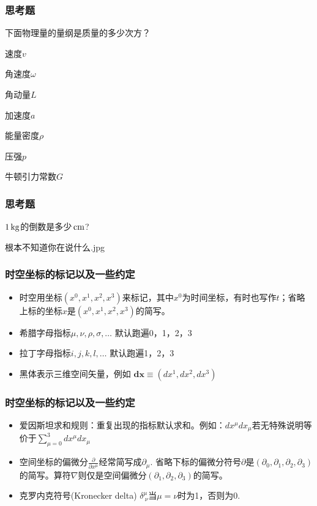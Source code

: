 \documentclass[CJK]{beamer}
\begin{document}
\begin{frame}
\frametitle{\bch 思考题\ech}
\bch
{}

下面物理量的量纲是质量的多少次方？

速度$v$

角速度$\omega$

角动量$L$

加速度$a$

能量密度$\rho$

压强$p$

牛顿引力常数$G$

\ech
\end{frame}


\begin{frame}
\frametitle{\bch 思考题 \ech}
\bch
$1\,\mathrm{kg}$的倒数是多少$\,\mathrm{cm}$?

\bcenter
{}

根本不知道你在说什么.jpg
\ecenter
\ech
\end{frame}



\begin{frame}
\frametitle{\bch 时空坐标的标记以及一些约定 \ech}
\bch
\begin{itemize}
\item{时空用坐标$(x^0, x^1, x^2, x^3)$来标记，其中$x^0$为时间坐标，有时也写作$t$；省略上标的坐标$x$是$(x^0, x^1, x^2, x^3)$的简写。}
\item{希腊字母指标$\mu, \nu, \rho, \sigma,\ldots$ 默认跑遍0，1，2，3}
\item{拉丁字母指标$i, j,  k, l,\ldots$ 默认跑遍1，2，3}
\item{黑体表示三维空间矢量，例如 $\mathbf{dx} \equiv (dx^1, dx^2, dx^3)$}
\end{itemize}
\ech
\end{frame}


\begin{frame}
\frametitle{\bch 时空坐标的标记以及一些约定 \ech}
\bch
\begin{itemize}
\item{爱因斯坦求和规则：重复出现的指标默认求和。例如：$dx^\mu dx_{\mu}$若无特殊说明等价于$\sum_{\mu = 0}^3 dx^\mu dx_{\mu}$} 
\item{空间坐标的偏微分$\frac{\partial}{\partial x^\mu}$经常简写成$\partial_\mu$. 省略下标的偏微分符号$\partial$是$(\partial_0,\partial_1,\partial_2,\partial_3)$的简写。算符$\nabla$则仅是空间偏微分$(\partial_1, \partial_2, \partial_3)$的简写。}
\item{克罗内克符号(Kronecker delta) $\delta^\mu_{\ \nu}$当$\mu = \nu$时为1，否则为0.}
\end{itemize}
\ech

\end{frame}
\end{document}
